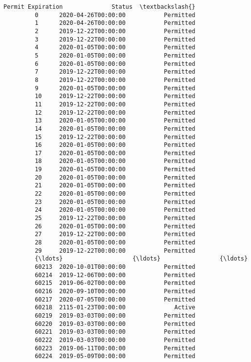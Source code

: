 \documentclass[11pt]{article}
\begin{document}
\begin{Verbatim}[commandchars=\\\{\}]
                  Permit Expiration              Status  \textbackslash{}
         0      2020-04-26T00:00:00           Permitted   
         1      2020-04-26T00:00:00           Permitted   
         2      2019-12-22T00:00:00           Permitted   
         3      2019-12-22T00:00:00           Permitted   
         4      2020-01-05T00:00:00           Permitted   
         5      2020-01-05T00:00:00           Permitted   
         6      2020-01-05T00:00:00           Permitted   
         7      2019-12-22T00:00:00           Permitted   
         8      2019-12-22T00:00:00           Permitted   
         9      2020-01-05T00:00:00           Permitted   
         10     2019-12-22T00:00:00           Permitted   
         11     2019-12-22T00:00:00           Permitted   
         12     2019-12-22T00:00:00           Permitted   
         13     2020-01-05T00:00:00           Permitted   
         14     2020-01-05T00:00:00           Permitted   
         15     2019-12-22T00:00:00           Permitted   
         16     2020-01-05T00:00:00           Permitted   
         17     2020-01-05T00:00:00           Permitted   
         18     2020-01-05T00:00:00           Permitted   
         19     2020-01-05T00:00:00           Permitted   
         20     2020-01-05T00:00:00           Permitted   
         21     2020-01-05T00:00:00           Permitted   
         22     2020-01-05T00:00:00           Permitted   
         23     2020-01-05T00:00:00           Permitted   
         24     2020-01-05T00:00:00           Permitted   
         25     2019-12-22T00:00:00           Permitted   
         26     2020-01-05T00:00:00           Permitted   
         27     2019-12-22T00:00:00           Permitted   
         28     2020-01-05T00:00:00           Permitted   
         29     2019-12-22T00:00:00           Permitted   
         {\ldots}                    {\ldots}                 {\ldots}   
         60213  2020-10-01T00:00:00           Permitted   
         60214  2019-12-06T00:00:00           Permitted   
         60215  2019-06-02T00:00:00           Permitted   
         60216  2020-09-10T00:00:00           Permitted   
         60217  2020-07-05T00:00:00           Permitted   
         60218  2115-01-23T00:00:00              Active   
         60219  2019-03-03T00:00:00           Permitted   
         60220  2019-03-03T00:00:00           Permitted   
         60221  2019-03-03T00:00:00           Permitted   
         60222  2019-03-03T00:00:00           Permitted   
         60223  2019-06-11T00:00:00           Permitted   
         60224  2019-05-09T00:00:00           Permitted   

\end{Verbatim}
\end{document}
